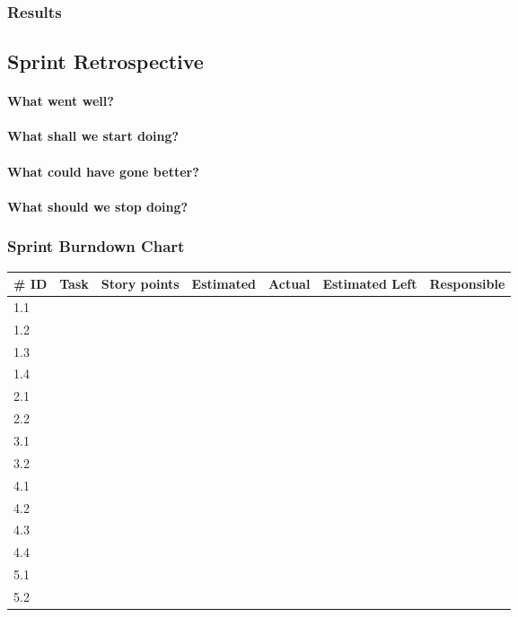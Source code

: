 \subsubsection{Results}


\subsection{Sprint Retrospective}
\label{sec:sprintRetrospective}


\paragraph{What went well?}


\paragraph{What shall we start doing?}
\begin{enumerate}

\end{enumerate}

\paragraph{What could have gone better?}



\paragraph{What should we stop doing?}


\subsubsection{Sprint Burndown Chart}
\newpage{}
\begin{table}[h]
\begin{sideways}
\begin{tabular}{l p{6.5cm} l l l l l }
\hline
  \#  ID 	& Task 	& Story points 	& Estimated & Actual &
  Estimated Left & Responsible \\
\hline
  1.1 & & & &  &  & \\
\hline
  1.2 & & & & & & \\
\hline
  1.3 & & & & & & \\
\hline
  1.4 & & & & & & \\
\hline
  2.1 & & & & & & \\
\hline
2.2 & & & & & & \\
\hline
3.1 & & & & & & \\
\hline
3.2 & & & & & & \\
\hline
4.1 & & & & & & \\
\hline
4.2 & & & & & &  \\
\hline
4.3 & & & & & & \\
\hline
4.4 &  & & & & & \\ 
\hline 
5.1 & & & & & &  \\ 
\hline 
5.2 & & & & & &  \\ 
\hline 
\end{tabular}
\end{sideways}
\end{table}